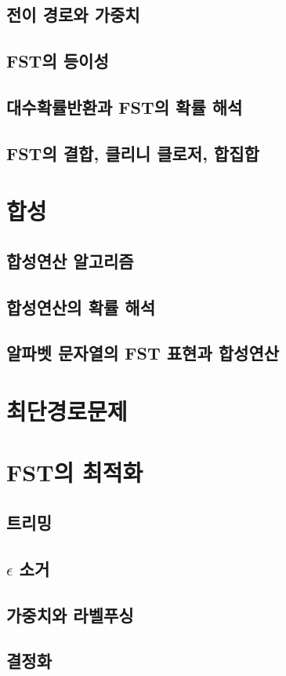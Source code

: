 \documentclass{book}
\begin{document}
\subsection{전이 경로와 가중치}
\subsection{FST의 등이성}
\subsection{대수확률반환과 FST의 확률 해석}
\subsection{FST의 결합, 클리니 클로저, 합집합}
\section{합성}
\subsection{합성연산 알고리즘}
\subsection{합성연산의 확률 해석}
\subsection{알파벳 문자열의 FST 표현과 합성연산}
\section{최단경로문제}
\section{FST의 최적화}
\subsection{트리밍}
\subsection{$\epsilon$ 소거}
\subsection{가중치와 라벨푸싱}
\subsection{결정화}
\end{document}
